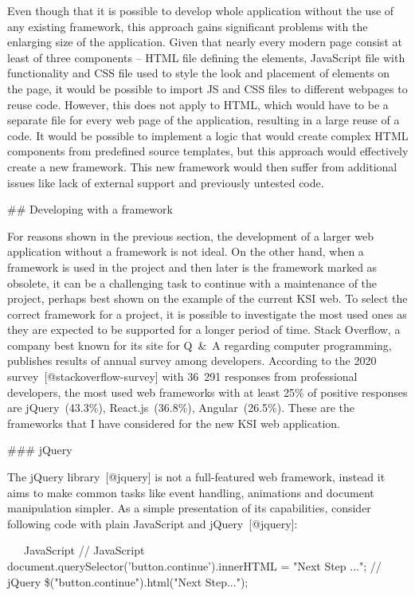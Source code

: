 \documentclass[
  digital, %
  oneside, %
  lof,     %
  lot,     %
]{fithesis4}
\begin{document}
Even though that it is possible to develop whole application without the use of any existing framework, this approach gains significant problems with the enlarging size of the application. Given that nearly every modern page consist at least of three components -- HTML file defining the elements, JavaScript file with functionality and CSS file used to style the look and placement of elements on the page, it would be possible to import JS and CSS files to different webpages to reuse code. However, this does not apply to HTML, which would have to be a separate file for every web page of the application, resulting in a large reuse of a code. It would be possible to implement a logic that would create complex HTML components from predefined source templates, but this approach would effectively create a new framework. This new framework would then suffer from additional issues like lack of external support and previously untested code.

## Developing with a framework

For reasons shown in the previous section, the development of a larger web application without a framework is not ideal. On the other hand, when a framework is used in the project and then later is the framework marked as obsolete, it can be a challenging task to continue with a maintenance of the project, perhaps best shown on the example of the current KSI web. To select the correct framework for a project, it is possible to investigate the most used ones as they are expected to be supported for a longer period of time. Stack Overflow, a company best known for its site for Q~\&~A regarding computer programming, publishes results of annual survey among developers. According to the 2020 survey~[@stackoverflow-survey] with 36~291 responses from professional developers, the most used web frameworks with at least 25\% of positive responses are jQuery~(43.3\%), React.js~(36.8\%), Angular~(26.5\%). These are the frameworks that I have considered for the new KSI web application.

### jQuery

The jQuery library~[@jquery] is not a full-featured web framework, instead it aims to make common tasks like event handling, animations and document manipulation simpler. As a simple presentation of its capabilities, consider following code with plain JavaScript and jQuery~[@jquery]:

~~~JavaScript
// JavaScript
document.querySelector('button.continue').innerHTML = "Next Step ...";
// jQuery
\$("button.continue").html("Next Step...");
~~~
\end{document}
